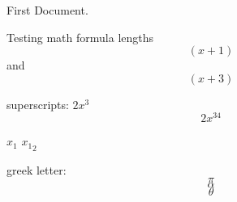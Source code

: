 \documentclass[11pt]{article}
\begin{document}
First Document.

Testing math formula
lengths $$(x+1)$$ and $$(x+3)$$

superscripts: $2x^3$
$$2x^{34}$$

$x_1$
${x_1}_2$

greek letter:
$$\pi$$
$$\alpha$$
$$\theta$$
\end{document}
